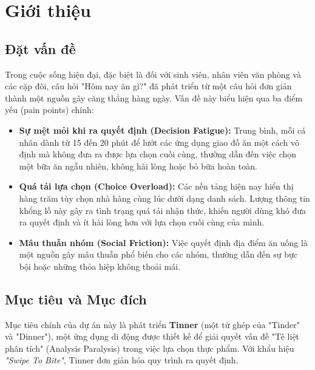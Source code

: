 \section{Giới thiệu}
\label{sec:introduction}

\subsection{Đặt vấn đề}
Trong cuộc sống hiện đại, đặc biệt là đối với sinh viên, nhân viên văn phòng và các cặp đôi, câu hỏi "Hôm nay ăn gì?" đã phát triển từ một câu hỏi đơn giản thành một nguồn gây căng thẳng hàng ngày. Vấn đề này biểu hiện qua ba điểm yếu (pain points) chính:
\begin{itemize}
    \item \textbf{Sự mệt mỏi khi ra quyết định (Decision Fatigue):} Trung bình, mỗi cá nhân dành từ 15 đến 20 phút để lướt các ứng dụng giao đồ ăn một cách vô định mà không đưa ra được lựa chọn cuối cùng, thường dẫn đến việc chọn một bữa ăn ngẫu nhiên, không hài lòng hoặc bỏ bữa hoàn toàn.
    \item \textbf{Quá tải lựa chọn (Choice Overload):} Các nền tảng hiện nay hiển thị hàng trăm tùy chọn nhà hàng cùng lúc dưới dạng danh sách. Lượng thông tin khổng lồ này gây ra tình trạng quá tải nhận thức, khiến người dùng khó đưa ra quyết định và ít hài lòng hơn với lựa chọn cuối cùng của mình.
    \item \textbf{Mâu thuẫn nhóm (Social Friction):} Việc quyết định địa điểm ăn uống là một nguồn gây mâu thuẫn phổ biến cho các nhóm, thường dẫn đến sự bực bội hoặc những thỏa hiệp không thoải mái.
\end{itemize}

\subsection{Mục tiêu và Mục đích}
Mục tiêu chính của dự án này là phát triển \textbf{Tinner} (một từ ghép của "Tinder" và "Dinner"), một ứng dụng di động được thiết kế để giải quyết vấn đề "Tê liệt phân tích" (Analysis Paralysis) trong việc lựa chọn thực phẩm. Với khẩu hiệu \textit{"Swipe To Bite"}, Tinner đơn giản hóa quy trình ra quyết định.

